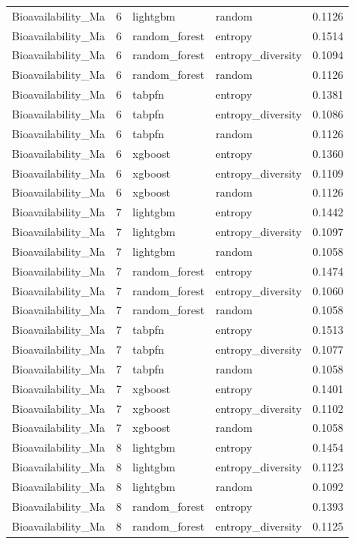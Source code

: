 \begin{tabular}{lrllr}
Bioavailability_Ma & 6 & lightgbm & random & 0.1126 \\
Bioavailability_Ma & 6 & random_forest & entropy & 0.1514 \\
Bioavailability_Ma & 6 & random_forest & entropy_diversity & 0.1094 \\
Bioavailability_Ma & 6 & random_forest & random & 0.1126 \\
Bioavailability_Ma & 6 & tabpfn & entropy & 0.1381 \\
Bioavailability_Ma & 6 & tabpfn & entropy_diversity & 0.1086 \\
Bioavailability_Ma & 6 & tabpfn & random & 0.1126 \\
Bioavailability_Ma & 6 & xgboost & entropy & 0.1360 \\
Bioavailability_Ma & 6 & xgboost & entropy_diversity & 0.1109 \\
Bioavailability_Ma & 6 & xgboost & random & 0.1126 \\
Bioavailability_Ma & 7 & lightgbm & entropy & 0.1442 \\
Bioavailability_Ma & 7 & lightgbm & entropy_diversity & 0.1097 \\
Bioavailability_Ma & 7 & lightgbm & random & 0.1058 \\
Bioavailability_Ma & 7 & random_forest & entropy & 0.1474 \\
Bioavailability_Ma & 7 & random_forest & entropy_diversity & 0.1060 \\
Bioavailability_Ma & 7 & random_forest & random & 0.1058 \\
Bioavailability_Ma & 7 & tabpfn & entropy & 0.1513 \\
Bioavailability_Ma & 7 & tabpfn & entropy_diversity & 0.1077 \\
Bioavailability_Ma & 7 & tabpfn & random & 0.1058 \\
Bioavailability_Ma & 7 & xgboost & entropy & 0.1401 \\
Bioavailability_Ma & 7 & xgboost & entropy_diversity & 0.1102 \\
Bioavailability_Ma & 7 & xgboost & random & 0.1058 \\
Bioavailability_Ma & 8 & lightgbm & entropy & 0.1454 \\
Bioavailability_Ma & 8 & lightgbm & entropy_diversity & 0.1123 \\
Bioavailability_Ma & 8 & lightgbm & random & 0.1092 \\
Bioavailability_Ma & 8 & random_forest & entropy & 0.1393 \\
Bioavailability_Ma & 8 & random_forest & entropy_diversity & 0.1125 \\

\end{tabular}
